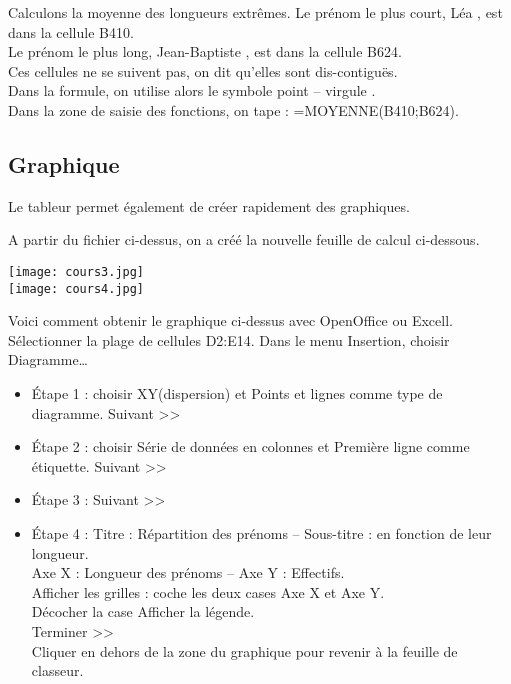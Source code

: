 \documentclass[10pt]{article}
\begin{document}
{\begin{Ex} Calculons la moyenne des longueurs extrêmes.
		Le prénom le plus court, \og  Léa \fg{}, est dans la cellule B410.\\
		Le prénom le plus long, \og  Jean-Baptiste  \fg{}, est dans la cellule B624.\\
		Ces cellules ne se suivent pas, on dit qu'elles sont dis-contiguës.\\
		Dans la formule, on utilise alors le symbole \og  point – virgule \fg{}.\\
		Dans la zone de saisie des fonctions, on tape : =MOYENNE(B410;B624).
\end{Ex}
\newpage 

\subsection{Graphique}
\begin{shaded}
Le tableur permet également de créer rapidement des graphiques.
\end{shaded}

\begin{Ex}
A partir du fichier ci-dessus, on a créé la nouvelle feuille de calcul ci-dessous.
\begin{multicols}{2}
\texttt{[image: cours3.jpg]}
\vspace{0.5cm}\\
\texttt{[image: cours4.jpg]}  
\end{multicols}

Voici comment obtenir le graphique ci-dessus avec OpenOffice ou Excell.
Sélectionner la plage de cellules D2:E14. Dans le menu Insertion, choisir Diagramme… 
\begin{itemize}
\item Étape 1 : choisir XY(dispersion) et Points et lignes comme type de diagramme. Suivant >>
\item Étape 2 : choisir Série de données en colonnes et Première ligne comme étiquette. Suivant >>
\item Étape 3 : Suivant >>
\item Étape 4 : Titre : Répartition des prénoms – Sous-titre : en fonction de leur longueur.\\
		Axe X : Longueur des prénoms – Axe Y : Effectifs.\\ 
		Afficher les grilles : coche les deux cases Axe X et Axe Y.\\
		Décocher la case Afficher la légende.\\ Terminer >>\\
Cliquer en dehors de la zone du graphique pour revenir à la feuille de classeur.
\end{itemize}
\end{Ex}








}
\end{document}

